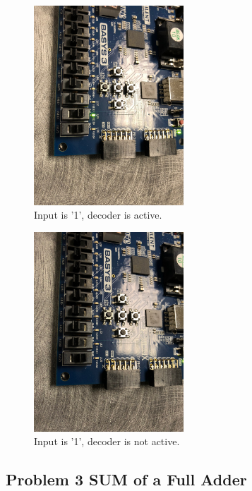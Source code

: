 \documentclass[11pt]{article}
\begin{document}
\begin{figure}[H]
\begin{center}
\includegraphics[width=0.5\textwidth]{report-images/Part2/IMG_0447.jpg}
\caption{Input is '1', decoder is active.}
\label{fig:decoderImgThree}
\end{center}
\end{figure}

\begin{figure}[H]
\begin{center}
\includegraphics[width=0.5\textwidth]{report-images/Part2/IMG_0448.jpg}
\caption{Input is '1', decoder is not active.}
\label{fig:decoderImgFour}
\end{center}
\end{figure}

\pagebreak

\subsection{Problem 3 SUM of a Full Adder}
\end{document}
